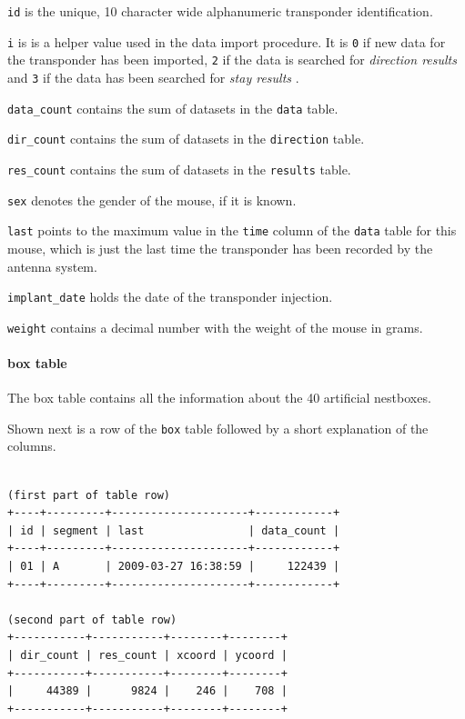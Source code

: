 \begin{mydesc}
	\item \lstinline|id| is the unique, 10 character wide alphanumeric transponder identification.
	\item \lstinline|i| is is a helper value used in the data import procedure. It is \lstinline|0| if new data for the transponder has been imported, \lstinline|2| if the data is searched for \textit{direction results} and \lstinline|3| if the data has been searched for \textit{stay results} .
	\item \lstinline|data_count| contains the sum of datasets in the \lstinline|data| table.
	\item \lstinline|dir_count| contains the sum of datasets in the \lstinline|direction| table.
	\item \lstinline|res_count| contains the sum of datasets in the \lstinline|results| table.
	\item \lstinline|sex| denotes the gender of the mouse, if it is known.
	\item \lstinline|last| points to the maximum value in the \lstinline|time| column of the \lstinline|data| table for this mouse, which is just the last time the transponder has been recorded by the antenna system.
	\item \lstinline|implant_date| holds the date of the transponder injection.
	\item \lstinline|weight| contains a decimal number with the weight of the mouse in grams.
\end{mydesc}

\paragraph{box table}
\label{para:box_table}

The box table contains all the information about the 40 artificial nestboxes. 

Shown next is a row of the \lstinline|box| table followed by a short explanation of the columns.
\codescript
\begin{lstlisting}[frame=none]

(first part of table row)
+----+---------+---------------------+------------+
| id | segment | last                | data_count |
+----+---------+---------------------+------------+
| 01 | A       | 2009-03-27 16:38:59 |     122439 | 
+----+---------+---------------------+------------+

(second part of table row)
+-----------+-----------+--------+--------+
| dir_count | res_count | xcoord | ycoord |
+-----------+-----------+--------+--------+
|     44389 |      9824 |    246 |    708 | 
+-----------+-----------+--------+--------+

\end{lstlisting}

